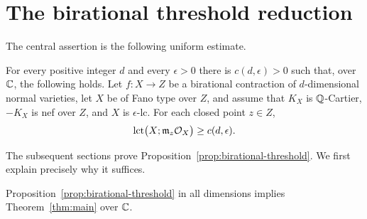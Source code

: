 \section{The birational threshold reduction}
\label{sec:reduction}

The central assertion is the following uniform estimate.

\begin{proposition}\label{prop:birational-threshold}
For every positive integer $d$ and every $\epsilon>0$ there is
$c(d,\epsilon)>0$ such that, over $\mathbb C$, the following holds. Let
$f\colon X\to Z$ be a birational contraction of $d$-dimensional normal
varieties, let $X$ be of Fano type over $Z$, and assume that $K_X$ is
$\mathbb Q$-Cartier, $-K_X$ is nef over $Z$, and $X$ is $\epsilon$-lc. For each
closed point $z\in Z$,
\begin{equation}\label{eq:A1}
 \operatorname{lct}\bigl(X;\mathfrak m_z\mathcal O_X\bigr)\ge c(d,\epsilon).
\end{equation}
\end{proposition}

The subsequent sections prove Proposition~\ref{prop:birational-threshold}.
We first explain precisely why it suffices.

\begin{lemma}\label{lem:threshold-to-complement}
Proposition~\ref{prop:birational-threshold} in all dimensions implies
Theorem~\ref{thm:main} over $\mathbb C$.
\end{lemma}

